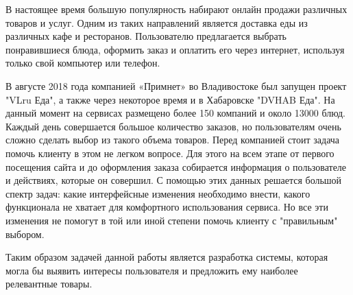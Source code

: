В настоящее время большую популярность набирают онлайн продажи различных товаров
и услуг. Одним из таких направлений является доставка еды из различных кафе и
ресторанов. Пользователю предлагается выбрать понравившиеся блюда, оформить заказ
и оплатить его через интернет, используя только свой компьютер или телефон.

В августе 2018 года компанией «Примнет» во Владивостоке был запущен проект "VLru Еда",
а также через некоторое время и в Хабаровске "DVHAB Еда". На данный момент на сервисах
размещено более 150 компаний и около 13000 блюд. Каждый день совершается большое
количество заказов, но пользователям очень сложно сделать выбор из такого объема товаров.
Перед компанией стоит задача помочь клиенту в этом не легком вопросе. Для этого
на всем этапе от первого посещения сайта и до оформления заказа собирается информация о
пользователе и действиях, которые он совершил. С помощью этих данных решается
большой спектр задач: какие интерфейсные изменения необходимо внести, какого
функционала не хватает для комфортного использования сервиса. Но все эти изменения
не помогут в той или иной степени помочь клиенту с "правильным" выбором.

Таким образом задачей данной работы является разработка системы, которая могла бы
выявить интересы пользователя и предложить ему наиболее релевантные товары.

